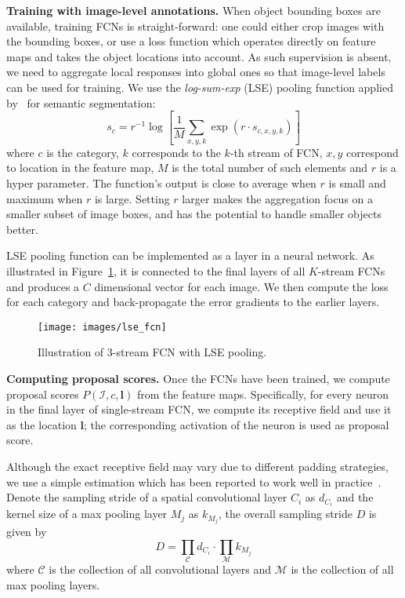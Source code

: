 \documentclass[10pt,twocolumn,letterpaper]{article}
\begin{document}
\textbf{Training with image-level annotations.} When object bounding boxes are available, training FCNs is straight-forward: one could either crop images with the bounding boxes, or use a loss function which operates directly on feature maps and takes the object locations into account. As such supervision is absent, we need to aggregate local responses into global ones so that image-level labels can be used for training. We use the \textit{log-sum-exp} (LSE) pooling function applied by~\cite{pinheiro:2015a} for semantic segmentation:
\begin{equation}
s_{c} = r^{-1}\log\left[\frac{1}{M}\sum_{x,y,k}\exp(r\cdot s_{c,x,y,k})\right]
\end{equation}
where $c$ is the category, $k$ corresponds to the $k$-th stream of FCN, $x,y$ correspond to location in the feature map, $M$ is the total number of such elements and $r$ is a hyper parameter. The function's output is close to average when $r$ is small and maximum when $r$ is large. Setting $r$ larger makes the aggregation focus on a smaller subset of image boxes, and has the potential to handle smaller objects better.

LSE pooling function can be implemented as a layer in a neural network. As illustrated in Figure~\ref{fig:lse}, it is connected to the final layers of all $K$-stream FCNs and produces a $C$ dimensional vector for each image. We then compute the loss for each category and back-propagate the error gradients to the earlier layers.

\begin{figure}
  \centering
    \texttt{[image: images/lse\_fcn]}
  \caption{Illustration of 3-stream FCN with LSE pooling.}
  \label{fig:lse}
\end{figure}



\textbf{Computing proposal scores.} Once the FCNs have been trained, we compute proposal scores $P(\mathcal{I}, c, \mathbf{l})$ from the feature maps. Specifically, for every neuron in the final layer of single-stream FCN, we compute its receptive field and use it as the location $\mathbf{l}$; the corresponding activation of the neuron is used as proposal score. 

Although the exact receptive field may vary due to different padding strategies, we use a simple estimation which has been reported to work well in practice~\cite{DBLP:journals/corr/SermanetEZMFL13}. Denote the sampling stride of a spatial convolutional layer $C_i$ as $d_{C_i}$ and the kernel size of a max pooling layer $M_j$ as $k_{M_j}$, the overall sampling stride $D$ is given by
\begin{equation}
D = \prod_{\mathcal{C}} d_{C_i} \cdot \prod_{\mathcal{M}} k_{M_j}
\end{equation}
where $\mathcal{C}$ is the collection of all convolutional layers and $\mathcal{M}$ is the collection of all max pooling layers.
\end{document}
